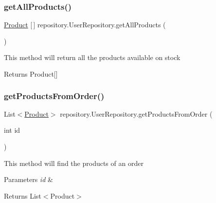 \subsubsection{\texorpdfstring{get\+All\+Products()}{getAllProducts()}}
{\footnotesize\ttfamily \mbox{\hyperlink{classentity_1_1_product}{Product}} \mbox{[}$\,$\mbox{]} repository.\+User\+Repository.\+get\+All\+Products (\begin{DoxyParamCaption}{ }\end{DoxyParamCaption})\hspace{0.3cm}{\ttfamily [inline]}}

This method will return all the products available on stock \begin{DoxyReturn}{Returns}
Product\mbox{[}\mbox{]} 
\end{DoxyReturn}
\mbox{\label{classrepository_1_1_user_repository_a413de9a5357ced95cfe6524c47b98bee}} 
\subsubsection{\texorpdfstring{get\+Products\+From\+Order()}{getProductsFromOrder()}}
{\footnotesize\ttfamily List$<$\mbox{\hyperlink{classentity_1_1_product}{Product}}$>$ repository.\+User\+Repository.\+get\+Products\+From\+Order (\begin{DoxyParamCaption}\item[{int}]{id }\end{DoxyParamCaption})\hspace{0.3cm}{\ttfamily [inline]}}

This method will find the products of an order 
\begin{DoxyParams}{Parameters}
{\em id} & ~\newline
\\
\hline
\end{DoxyParams}
\begin{DoxyReturn}{Returns}
List$<$\+Product$>$ 
\end{DoxyReturn}
\mbox{\label{classrepository_1_1_user_repository_a7da3f6411186e8169f5730638e6a4032}} 
